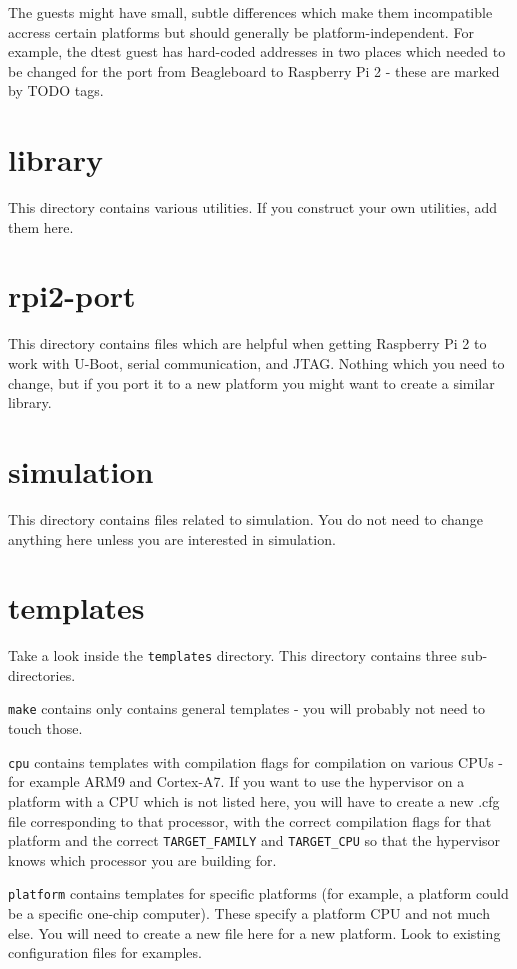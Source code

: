 \documentclass[a4paper,11pt,reqno]{amsart}
\begin{document}
The guests might have small, subtle differences which make them incompatible accress certain platforms but should generally be platform-independent. For example, the dtest guest has hard-coded addresses in two places which needed to be changed for the port from Beagleboard to Raspberry Pi 2 - these are marked by TODO tags.

\section{library}
\noindent
This directory contains various utilities. If you construct your own utilities, add them here.

\section{rpi2-port}
\noindent
This directory contains files which are helpful when getting Raspberry Pi 2 to work with U-Boot, serial communication, and JTAG. Nothing which you need to change, but if you port it to a new platform you might want to create a similar library.

\section{simulation}
\noindent
This directory contains files related to simulation. You do not need to change anything here unless you are interested in simulation.

\section{templates}
\noindent
Take a look inside the \texttt{templates} directory. This directory contains three sub-directories.

\texttt{make} contains only contains general templates - you will probably not need to touch those.

\texttt{cpu} contains templates with compilation flags for compilation on various CPUs - for example ARM9 and Cortex-A7. If you want to use the hypervisor on a platform with a CPU which is not listed here, you will have to create a new .cfg file corresponding to that processor, with the correct compilation flags for that platform and the correct \texttt{TARGET\_FAMILY} and \texttt{TARGET\_CPU} so that the hypervisor knows which processor you are building for.

\texttt{platform} contains templates for specific platforms (for example, a platform could be a specific one-chip computer). These specify a platform CPU and not much else. You will need to create a new file here for a new platform. Look to existing configuration files for examples.
\end{document}
